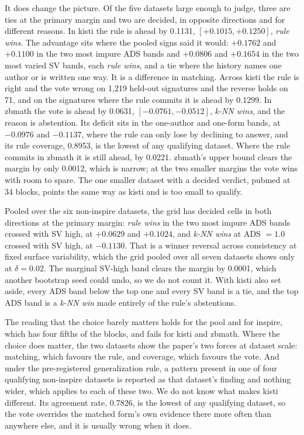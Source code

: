 \documentclass[11pt]{article}
\begin{document}
It does change the picture. Of the five datasets large enough to judge, three
are ties at the primary margin and two are decided, in opposite directions and
for different reasons. In kisti the rule is ahead by 0.1131,
$[+0.1015, +0.1250]$, \emph{rule wins}. The advantage sits where the pooled
signs said it would: $+0.1762$ and $+0.1100$ in the two most impure ADS bands
and $+0.0806$ and $+0.1654$ in the two most varied SV bands, each \emph{rule
wins}, and a tie where the history names one author or is written one way. It
is a difference in matching. Across kisti the rule is right and the vote wrong
on 1{,}219 held-out signatures and the reverse holds on 71, and on the
signatures where the rule commits it is ahead by 0.1299. In zbmath the vote is
ahead by 0.0631, $[-0.0761, -0.0512]$, \emph{k-NN wins}, and the reason is
abstention. Its deficit sits in the one-author and one-form bands, at
$-0.0976$ and $-0.1137$, where the rule can only lose by declining to answer,
and its rule coverage, 0.8953, is the lowest of any qualifying dataset. Where
the rule commits in zbmath it is still ahead, by 0.0221. zbmath's upper bound
clears the margin by only 0.0012, which is narrow; at the two smaller margins
the vote wins with room to spare. The one smaller
dataset with a decided verdict, pubmed at 34 blocks, points the same way as
kisti and is too small to qualify.

Pooled over the six non-inspire datasets, the grid has decided cells in both
directions at the primary margin: \emph{rule wins} in the two most impure ADS
bands crossed with SV high, at $+0.0629$ and $+0.1024$, and \emph{k-NN wins}
at ADS $= 1.0$ crossed with SV high, at $-0.1130$. That is a winner reversal
across consistency at fixed surface variability, which the grid pooled over
all seven datasets shows only at $\delta = 0.02$. The marginal SV-high band
clears the margin by 0.0001, which another bootstrap seed could undo, so we do
not count it. With kisti also set aside, every ADS band below the top one and
every SV band is a tie, and the top ADS band is a \emph{k-NN win} made
entirely of the rule's abstentions.

The reading that the choice barely matters holds for the pool and for inspire, which has four fifths of the blocks, and fails for kisti and zbmath. Where the choice does matter, the two datasets show the
paper's two forces at dataset scale: matching, which favours the rule, and
coverage, which favours the vote. And under the pre-registered generalization
rule, a pattern present in one of four qualifying non-inspire datasets is
reported as that dataset's finding and nothing wider, which applies to each of
these two. We do not know what makes kisti different. Its agreement rate,
0.7826, is the lowest of any qualifying dataset, so the vote overrides the
matched form's own evidence there more often than anywhere else, and it is
usually wrong when it does.
\end{document}
